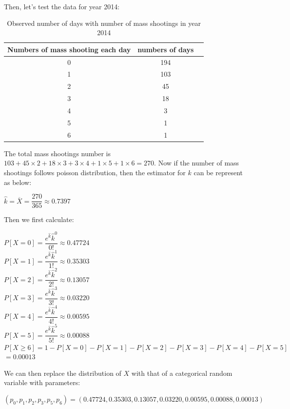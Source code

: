 \documentclass[12pt]{article}
\begin{document}
\par Then, let's test the data for year 2014:
\begin{table} [!htbp]
\begin{center}
\begin{tabular*} {14cm} {@{\extracolsep{\fill} }ccc}
\toprule
Numbers of mass shooting each day & numbers of days \\
\midrule
0 & 194 \\ \hline
1 & 103 \\ \hline
2 & 45 \\ \hline
3 & 18 \\ \hline
4 & 3  \\ \hline
5 & 1  \\ \hline
6 & 1  \\
\bottomrule
\end{tabular*}
\end{center}
\caption{Observed number of days with number of mass shootings in year 2014}
\end{table}
\par The total mass shootings number is $103+45\times2+18\times3+3\times4+1\times5+1\times6=270$. Now if the number of mass shootings follows poisson distribution, then the estimator for $k$ can be represent as below:
\begin{center}
$\hat k=\overline X=\dfrac{270}{365} \approx0.7397$
\end{center}
\par Then we first calculate:
\begin{center}
$P[X=0]=\dfrac{e^{\hat k}\hat k^0}{0!} \approx0.47724$\\
$P[X=1]=\dfrac{e^{\hat k}\hat k^1}{1!} \approx0.35303$\\
$P[X=2]=\dfrac{e^{\hat k}\hat k^2}{2!} \approx0.13057$\\
$P[X=3]=\dfrac{e^{\hat k}\hat k^3}{3!} \approx0.03220$\\
$P[X=4]=\dfrac{e^{\hat k}\hat k^4}{4!} \approx0.00595$\\
$P[X=5]=\dfrac{e^{\hat k}\hat k^5}{5!} \approx0.00088$\\
$P[X\geq6]=1-P[X=0]-P[X=1]-P[X=2]-P[X=3]-P[X=4]-P[X=5]$\\
$=0.00013$
\end{center}
\par We can then replace the distribution of $X$ with that of a categorical random variable with parameters:
\begin{center}
$(p_0,p_1,p_2,p_3,p_5,p_6)=(0.47724,0.35303,0.13057,0.03220,0.00595,0.00088,0.00013)$
\end{center}
\end{document}
